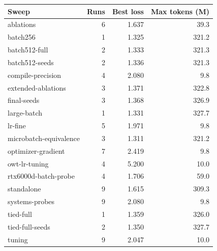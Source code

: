 \begin{tabular}{lrrr}\toprule
Sweep & Runs & Best loss & Max tokens (M)\\\midrule
ablations & 6 & 1.637 & 39.3\\
batch256 & 1 & 1.325 & 321.2\\
batch512-full & 2 & 1.333 & 321.3\\
batch512-seeds & 2 & 1.336 & 321.3\\
compile-precision & 4 & 2.080 & 9.8\\
extended-ablations & 3 & 1.371 & 322.8\\
final-seeds & 3 & 1.368 & 326.9\\
large-batch & 1 & 1.331 & 327.7\\
lr-fine & 5 & 1.971 & 9.8\\
microbatch-equivalence & 3 & 1.311 & 321.2\\
optimizer-gradient & 7 & 2.419 & 9.8\\
owt-lr-tuning & 4 & 5.200 & 10.0\\
rtx6000d-batch-probe & 4 & 1.706 & 59.0\\
standalone & 9 & 1.615 & 309.3\\
systems-probes & 9 & 2.080 & 9.8\\
tied-full & 1 & 1.359 & 326.0\\
tied-full-seeds & 2 & 1.350 & 327.7\\
tuning & 9 & 2.047 & 10.0\\
\bottomrule\end{tabular}

